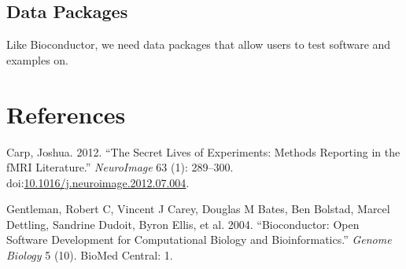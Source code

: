 \documentclass[]{elsarticle} %
\begin{document}
\subsection{Data Packages}\label{data-packages}

Like Bioconductor, we need data packages that allow users to test
software and examples on.

\section*{References}\label{references}

\hypertarget{refs}{}
\hypertarget{ref-carpux5fsecretux5f2012}{}
Carp, Joshua. 2012. ``The Secret Lives of Experiments: Methods Reporting
in the fMRI Literature.'' \emph{NeuroImage} 63 (1): 289--300.
doi:\href{https://doi.org/10.1016/j.neuroimage.2012.07.004}{10.1016/j.neuroimage.2012.07.004}.

\hypertarget{ref-gentleman2004bioconductor}{}
Gentleman, Robert C, Vincent J Carey, Douglas M Bates, Ben Bolstad,
Marcel Dettling, Sandrine Dudoit, Byron Ellis, et al. 2004.
``Bioconductor: Open Software Development for Computational Biology and
Bioinformatics.'' \emph{Genome Biology} 5 (10). BioMed Central: 1.
\end{document}
